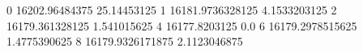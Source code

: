 0 16202.96484375 25.14453125
1 16181.9736328125 4.1533203125
2 16179.361328125 1.541015625
4 16177.8203125 0.0
6 16179.2978515625 1.4775390625
8 16179.9326171875 2.1123046875
